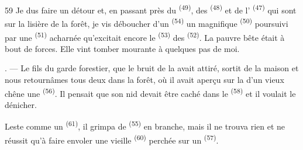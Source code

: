 \begin{VUpage}[61]{59}
\VUcontinue
{} Je dus faire un détour et, en passant\nl
près du  \textsuperscript{(49)}, des  \textsuperscript{(48)} et de l' \textsuperscript{(47)}\nl
qui sont sur la lisière de la forêt, je vis déboucher\nl
d'un  \textsuperscript{(54)} un magnifique  \textsuperscript{(50)} poursuivi par\nl
une  \textsuperscript{(51)} acharnée qu'excitait encore le  \textsuperscript{(53)}\nl
des  \textsuperscript{(52)}. La pauvre bête était à bout de\nl
forces. Elle vint tomber mourante à quelques pas de\nl
moi.

. --- Le fils du garde forestier, que le bruit de la\nl
{} avait attiré, sortit de la maison\nl
et nous retournâmes tous deux dans la forêt, où il\nl
avait aperçu sur la  d'un vieux chêne une\nl
{} \textsuperscript{(56)}. Il pensait que son nid devait être caché dans\nl
le  \textsuperscript{(58)} et il voulait le dénicher.

\VUblancAlinea
Leste comme un  \textsuperscript{(61)}, il grimpa de \cc
{} \textsuperscript{(55)} en branche, mais il ne trouva rien et ne réussit\nl
qu'à faire envoler une vieille  \textsuperscript{(60)} perchée\nl
sur un  \textsuperscript{(57)}.

\VUsaut{4.0mm}
\VUfilet{22mm}
\end{VUpage}
